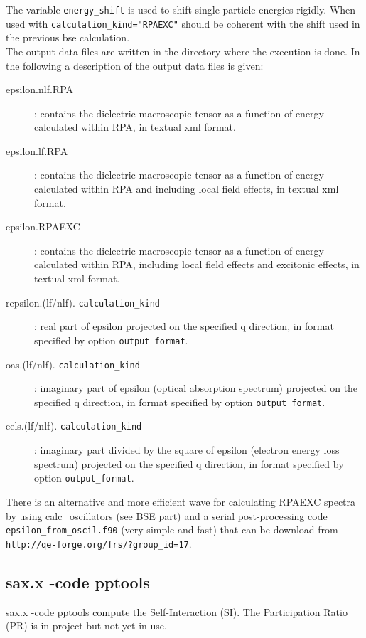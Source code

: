 \documentclass[11pt]{article}
\begin{document}
The variable \texttt{energy\_shift} is used to shift single particle energies rigidly. When used with \texttt{calculation\_kind="RPAEXC"} should be coherent with the shift used in the previous bse calculation.\\

The output data files are written in the directory where the execution is done. In the following a description of the output data files is given:

\begin{description}
\item[epsilon.nlf.RPA]: contains the dielectric macroscopic tensor as a function of energy calculated within RPA, in textual xml format.
\item[epsilon.lf.RPA]: contains the dielectric macroscopic tensor as a function of energy calculated within RPA and including local field effects, in textual xml format.
\item[epsilon.RPAEXC]: contains the dielectric macroscopic tensor as a function of energy calculated within RPA, including local field effects and excitonic effects, in textual xml format.
\item[repsilon.(lf/nlf). \texttt{calculation\_kind}]: real part of epsilon projected on the specified q direction, in format specified by option \texttt{output\_format}.
\item[oas.(lf/nlf). \texttt{calculation\_kind}]: imaginary part of epsilon (optical absorption spectrum) projected on the specified q direction, in format specified by option \texttt{output\_format}.
\item[eels.(lf/nlf). \texttt{calculation\_kind}]: imaginary part divided by the square of epsilon (electron energy loss spectrum) projected on the specified q direction, in format specified by option \texttt{output\_format}.
\end{description}

There is an alternative and more efficient wave for calculating RPAEXC spectra by using calc\_oscillators (see BSE part)
 and a serial post-processing code \texttt{epsilon\_from\_oscil.f90} (very simple and fast) that can be download from 
\texttt{http://qe-forge.org/frs/?group\_id=17}.


\subsection{sax.x -code pptools}
sax.x -code pptools compute the Self-Interaction (SI).
The Participation Ratio (PR) is in project but not yet in use.
\end{document}
